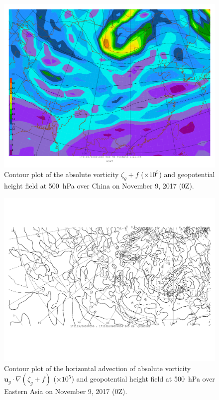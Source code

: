 \documentclass[11pt]{article}
\begin{document}
\begin{figure}[h!]
	\centering
	\includegraphics[width=\textwidth]{avorwnd_500hPa_China}
	\caption{Contour plot of the absolute vorticity $\zeta_g + f$ ($\times 10^5$) and geopotential height field at \SI{500}{\hecto\Pa} over China on November 9, 2017 (0Z).}
	\label{fig:avorwnd_500hPa_China}
\end{figure}

\begin{figure}[h!]
	\centering
	\includegraphics[width=\textwidth]{horizontal_advection_avor_500hPa_China}
	\caption{Contour plot of the horizontal advection of absolute vorticity $\bm{u}_g \cdot \nabla(\zeta_g + f)$ ($\times 10^5$) and geopotential height field at \SI{500}{\hecto\Pa} over Eastern Asia on November 9, 2017 (0Z).}
	\label{fig:horizontal_advection_avor_500hPa_China}
\end{figure}
\end{document}
